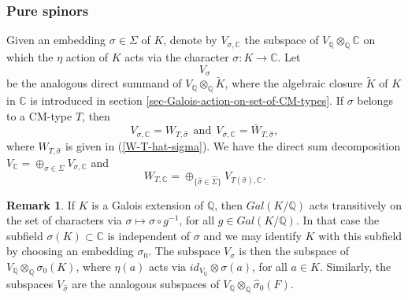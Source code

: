 \documentclass[12pt]{amsart}
\newcommand{\hide}[1]{}
\numberwithin{equation}{subsection}
\theoremstyle{plain}
\theoremstyle{definition}
\newtheorem{rem}[thm]{Remark}
\newcommand{\CC}{{\mathbb C}}
\newcommand{\QQ}{{\mathbb Q}}
\newcommand{\RR}{{\mathbb R}}
\begin{document}
{\subsubsection{Pure spinors}
Given an embedding $\sigma\in\Sigma$ of $K$, denote by $V_{\sigma,\CC}$ the subspace of $V_\QQ\otimes_\QQ\CC$ on which the $\eta$ action of $K$ acts via the character $\sigma:K\rightarrow\CC$. 
Let
\begin{equation}
\label{eq-V-sigma}
V_\sigma
\end{equation}
be the analogous direct summand of $V_\QQ\otimes_\QQ\tilde{K}$, where the algebraic closure $\tilde{K}$ of $K$ in $\CC$ is introduced in section \ref{sec-Galois-action-on-set-of-CM-types}.
If $\sigma$ belongs to a CM-type $T$, then 
\[V_{\sigma,\CC}=W_{T,\hat{\sigma}}
\ \  \mbox{and} \ \ V_{\bar{\sigma},\CC}=\bar{W}_{T,\hat{\sigma}},
\]
where $W_{T,\hat{\sigma}}$ is given in (\ref{W-T-hat-sigma}).
We have the direct sum decomposition $V_\CC=\oplus_{\sigma\in\Sigma}V_{\sigma,\CC}$
and
\begin{equation}
\label{eq-decomposition-of-W-T-CC}
W_{T,\CC}=\oplus_{\{\hat{\sigma}\in\hat{\Sigma}\}}V_{T(\hat{\sigma}),\CC}.
\end{equation} 
\hide{
The composition $V_\QQ\rightarrow V_\CC\rightarrow V_{\sigma,\CC}$, of the natural embedding with the projection on the direct summand, 
maps $V_\QQ$ isomorphically onto $V_\sigma$. The direct sum $\oplus_{\sigma\in\Sigma}V_\sigma$, considered as a $\QQ$-subspace of $V_\QQ\otimes_\QQ(K\otimes_\QQ\CC)$,
is isomorphic to the image of $V_\QQ\otimes_\QQ K$ via the analogue of (\ref{eq-embedding-of-V-tensor-F}).
}

\begin{rem}
If $K$ is a Galois extension of $\QQ$, then $Gal(K/\QQ)$ acts transitively on the set of characters via $\sigma\mapsto \sigma\circ g^{-1}$, for all $g\in Gal(K/\QQ)$.
In that case the subfield $\sigma(K)\subset \CC$ is independent of $\sigma$ and we may identify $K$ with this subfield by choosing an embedding $\sigma_0$.
The subspace $V_\sigma$ is then the subspace of $V_\QQ\otimes_\QQ \sigma_0(K)$, where $\eta(a)$ acts via $id_{V_\QQ}\otimes \sigma(a)$, for all $a\in K$. Similarly, the subspaces $V_{\hat{\sigma}}$ are the analogous subspaces of $V_\QQ\otimes_\QQ \hat{\sigma}_0(F)$.
\end{rem}

}
\end{document}
